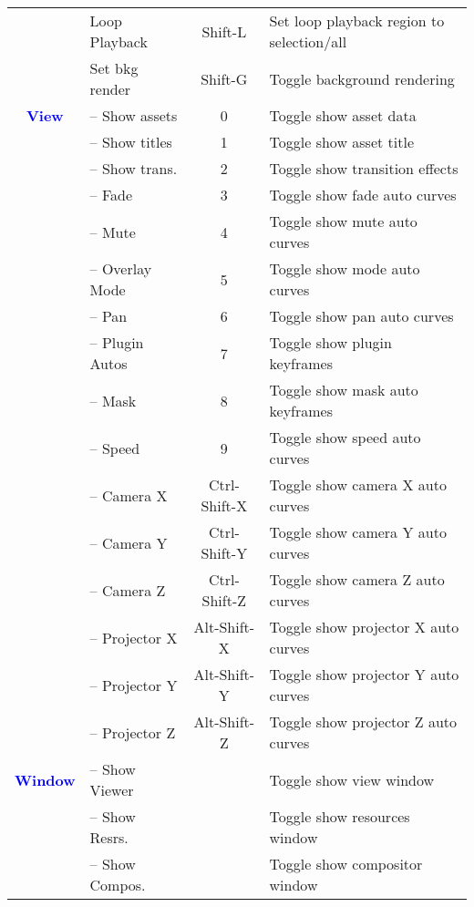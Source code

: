 \begin{center}
\begin{longtable}{>{\bfseries}c l c p{6cm}}
             & Loop Playback & Shift-L & Set loop playback region to selection/all \\             
             & Set bkg render & Shift-G & Toggle background rendering \\
             \midrule
          \textcolor{blue}{View} & -- Show assets & 0 & Toggle show asset data \\             
             & -- Show titles & 1 & Toggle show asset title \\             
             & -- Show trans. & 2 & Toggle show transition effects \\             
             & -- Fade & 3 & Toggle show fade auto curves \\             
             & -- Mute & 4 & Toggle show mute auto curves \\             
             & -- Overlay Mode & 5 & Toggle show mode auto curves \\             
             & -- Pan & 6 & Toggle show pan auto curves \\             
             & -- Plugin Autos & 7 & Toggle show plugin keyframes \\             
             & -- Mask & 8 & Toggle show mask auto keyframes \\             
             & -- Speed & 9 & Toggle show speed auto curves \\             
             & -- Camera X & Ctrl-Shift-X & Toggle show camera X auto curves \\             
             & -- Camera Y & Ctrl-Shift-Y & Toggle show camera Y auto curves \\             
             & -- Camera Z & Ctrl-Shift-Z & Toggle show camera Z auto curves \\             
             & -- Projector X & Alt-Shift-X & Toggle show projector X auto curves \\             
             & -- Projector Y & Alt-Shift-Y & Toggle show projector Y auto curves \\             
             & -- Projector Z & Alt-Shift-Z & Toggle show projector Z auto curves \\
             \midrule
          \textcolor{blue}{Window} & -- Show Viewer &  & Toggle show view window \\             
             & -- Show Resrs. &  & Toggle show resources window \\             
             & -- Show Compos. &  & Toggle show compositor window \\             

\end{longtable}
\end{center}
